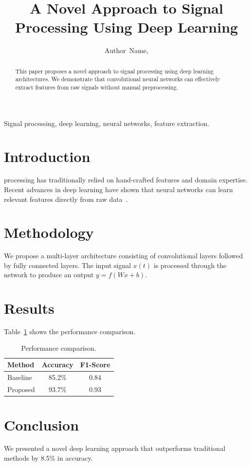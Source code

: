 \documentclass[journal]{IEEEtran}
\begin{document}
\title{A Novel Approach to Signal Processing Using Deep Learning}
\author{Author~Name, }

\maketitle

\begin{abstract}
This paper proposes a novel approach to signal processing
using deep learning architectures. We demonstrate that
convolutional neural networks can effectively extract
features from raw signals without manual preprocessing.
\end{abstract}

\begin{IEEEkeywords}
Signal processing, deep learning, neural networks, feature extraction.
\end{IEEEkeywords}

\section{Introduction}
 processing has traditionally relied
on hand-crafted features and domain expertise. Recent advances
in deep learning have shown that neural networks can learn
relevant features directly from raw data~\cite{ref1}.

\section{Methodology}
We propose a multi-layer architecture consisting of
convolutional layers followed by fully connected layers.
The input signal $x(t)$ is processed through the network
to produce an output $y = f(Wx + b)$.

\section{Results}
Table~\ref{tab:results} shows the performance comparison.

\begin{table}[htbp]
\caption{Performance comparison.}
\label{tab:results}
\centering
\begin{tabular}{lcc}
\toprule
Method & Accuracy & F1-Score \\
\midrule
Baseline & 85.2\% & 0.84 \\
Proposed & 93.7\% & 0.93 \\
\bottomrule
\end{tabular}
\end{table}

\section{Conclusion}
We presented a novel deep learning approach that outperforms
traditional methods by 8.5\% in accuracy.



\end{document}
